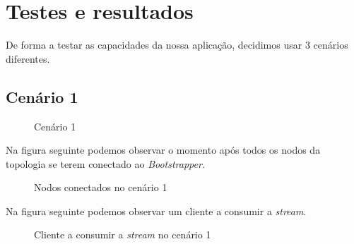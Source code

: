 \documentclass[a4paper, 11pt]{article}
\begin{document}


\section{Testes e resultados}

De forma a testar as capacidades da nossa aplicação, decidimos usar 3 cenários diferentes.

\subsection{Cenário 1}

\begin{figure}[H]
    \centering
    \caption {Cenário 1}
\end{figure}

Na figura seguinte podemos observar o momento após todos os nodos da topologia se terem conectado ao \textit{Bootstrapper}.

\begin{figure}[H]
    \centering
    \caption {Nodos conectados no cenário 1}
\end{figure}

Na figura seguinte podemos observar um cliente a consumir a \textit{stream}.

\begin{figure}[H]
    \centering
    \caption {Cliente a consumir a \textit{stream} no cenário 1}
\end{figure}
\end{document}
